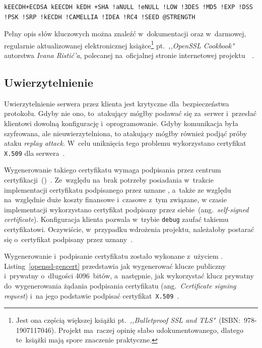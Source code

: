 \documentclass[thesis]{subfiles}
\begin{document}
\begin{lstlisting}[numbers=none,caption={Filtr \texttt{OpenSSL} dla algorytmów użytych w~projekcie},label=openssl-filter]
kEECDH+ECDSA kEECDH kEDH +SHA !aNULL !eNULL !LOW !3DES !MD5 !EXP !DSS !PSK !SRP !kECDH !CAMELLIA !IDEA !RC4 !SEED @STRENGTH
\end{lstlisting}

Pełny opis słów kluczowych można znaleźć w~dokumentacji  oraz w~darmowej, regularnie aktualizowanej elektronicznej książce\footnote{Jest ona częścią większej książki pt.~\emph{,,Bulletproof SSL and TLS"}~(ISBN:~978-1907117046). Projekt  ma~raczej opinię słabo udokumentowanego, dlatego te~książki mają spore znaczenie praktyczne.} pt.~\emph{,,OpenSSL Cookbook"} autorstwa \emph{Ivana Ristić'a}, polecanej na~oficjalnej stronie internetowej projektu~~\cite{openssl-cookbook-suites}.

\subsection{Uwierzytelnienie}

Uwierzytelnienie serwera przez klienta jest krytyczne dla~bezpieczeństwa protokołu. Gdyby nie ono, to~atakujący mógłby podawać się za~serwer i~przesłać klientowi dowolną konfigurację i~oprogramowanie. Gdyby komunikacja była szyfrowana, ale nieuwierzytelniona, to atakujący mógłby również podjąć próby ataku \emph{replay attack}. W~celu uniknięcia tego problemu wykorzystano certyfikat \texttt{X.509} dla serwera~\cite{wiki:x509}.

Wygenerowanie takiego certyfikatu wymaga podpisania przez centrum certyfikacji~()~\cite{wiki:ca}. Ze~względu na~brak potrzeby posiadania w~trakcie implementacji certyfikatu podpisanego przez uznane , a~także ze względu na~względnie duże koszty finansowe i~czasowe z~tym związane, w czasie implementacji wykorzystano certyfikat podpisany przez siebie~(ang.~\emph{self-signed certificate}). Konfiguracja klienta pozwala w~trybie \texttt{debug} zaufać takiemu certyfikatowi. Oczywiście, w~przypadku wdrożenia projektu, należałoby postarać się o~certyfikat podpisany przez uznany~.

Wygenerowanie i~podpisanie certyfikatu zostało wykonane z~użyciem . Listing~\ref{openssl-gencert} przedstawia jak wygenerować klucze publiczny i~prywatny  o~długości 4096~bitów, a~następnie, jak wykorzystać klucz prywatny do~wygenerowania żądania podpisania certyfikatu (ang.~\emph{Certificate signing request}) i~na jego podstawie podpisać certyfikat~\texttt{X.509}~\cite{openssl-cookbook,wiki:csr}.
\end{document}
